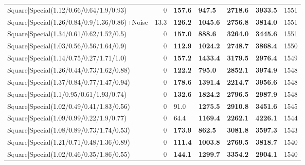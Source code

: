 \begin{tabular}{lrllllr}
 Square|Special(1.12/0.66/0.64/1.9/0.93)                       &             0   & \textbf{157.6} & \textbf{947.5}  & \textbf{2718.6} & \textbf{3933.5} &         1551 \\
 Square|Special(1.26/0.84/0.9/1.36/0.86)+Noise                 &            13.3 & \textbf{126.2} & \textbf{1045.6} & \textbf{2756.8} & \textbf{3814.0} &         1551 \\
 Square|Special(1.34/0.61/0.62/1.52/0.5)                       &             0   & \textbf{157.0} & \textbf{888.6}  & \textbf{3264.0} & \textbf{3445.6} &         1551 \\
 Square|Special(1.03/0.56/0.56/1.64/0.9)                       &             0   & \textbf{112.9} & \textbf{1024.2} & \textbf{2748.7} & \textbf{3868.4} &         1550 \\
 Square|Special(1.14/0.75/0.27/1.71/1.0)                       &             0   & \textbf{157.2} & \textbf{1433.4} & \textbf{3179.5} & \textbf{2976.4} &         1549 \\
 Square|Special(1.26/0.44/0.73/1.62/0.88)                      &             0   & \textbf{122.2} & \textbf{795.0}  & \textbf{2852.1} & \textbf{3974.9} &         1548 \\
 Square|Special(1.37/0.84/0.77/1.47/0.94)                      &             0   & \textbf{178.6} & \textbf{1391.4} & \textbf{2214.7} & \textbf{3956.6} &         1548 \\
 Square|Special(1.1/0.95/0.61/1.93/0.74)                       &             0   & \textbf{132.6} & \textbf{1824.2} & \textbf{2796.5} & \textbf{2987.9} &         1548 \\
 Square|Special(1.02/0.49/0.41/1.83/0.56)                      &             0   & 91.0           & \textbf{1275.5} & \textbf{2910.8} & \textbf{3451.6} &         1545 \\
 Square|Special(1.09/0.99/0.22/1.9/0.77)                       &             0   & 64.4           & \textbf{1169.4} & \textbf{2262.1} & \textbf{4226.1} &         1544 \\
 Square|Special(1.08/0.89/0.73/1.74/0.53)                      &             0   & \textbf{173.9} & \textbf{862.5}  & \textbf{3081.8} & \textbf{3597.3} &         1543 \\
 Square|Special(1.21/0.71/0.48/1.36/0.89)                      &             0   & \textbf{111.4} & \textbf{1003.8} & \textbf{2769.5} & \textbf{3818.7} &         1540 \\
 Square|Special(1.02/0.46/0.35/1.86/0.55)                      &             0   & \textbf{144.1} & \textbf{1299.7} & \textbf{3354.2} & \textbf{2904.1} &         1540 \\

\end{tabular}
